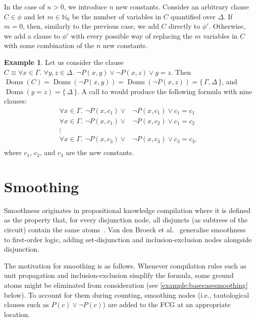 \documentclass{article}
\theoremstyle{definition}
\newtheorem{example}{Example}
\theoremstyle{remark}
\DeclareMathOperator{\Doms}{Doms}
\begin{document}
In the case of $n>0$, we introduce $n$ new constants. Consider an arbitrary
clause $C \in \phi$ and let $m \in \mathbb{N}_{0}$ be the number of variables in
$C$ quantified over $\Delta$. If $m=0$, then, similarly to the previous case, we
add $C$ directly to $\phi'$. Otherwise, we add a clause to $\phi'$ with every
possible way of replacing the $m$ variables in $C$ with some combination of the
$n$ new constants.

\begin{example}
  Let us consider the clause $C \equiv \forall x \in \Gamma\text{.
  }\forall y, z \in \Delta\text{. } \neg P(x, y) \lor \neg P(x, z) \lor y=z$.
  Then
  $\Doms(C) = \Doms(\neg P(x, y)) = \Doms(\neg P(x, z)) = \{\, \Gamma, \Delta \,\}$,
  and $\Doms(y=z) = \{\, \Delta \,\}$. A call to  would produce the following formula with nine clauses:
  \begin{align*}
    \forall x \in \Gamma\text{. }\neg P(x, c_{1}) \lor& \neg P(x, c_{1}) \lor c_{1}=c_{1}\\
    \forall x \in \Gamma\text{. }\neg P(x, c_{1}) \lor& \neg P(x, c_{2}) \lor c_{1}=c_{2}\\
    \vdots&\\
    \forall x \in \Gamma\text{. }\neg P(x, c_{3}) \lor& \neg P(x, c_{3}) \lor c_{3}=c_{3},\\
  \end{align*}
  where $c_{1}$, $c_{2}$, and $c_{3}$ are the new constants.
\end{example}

\section{Smoothing}

Smoothness originates in propositional knowledge compilation where it is defined
as the property that, for every disjunction node, all disjuncts (as subtrees of
the circuit) contain the same atoms~\cite{darwiche2001tractable}. Van den Broeck
et al.~ generalise smoothness to
first-order logic, adding set-disjunction and inclusion-exclusion nodes
alongside disjunction.

The motivation for smoothing is as follows. Whenever compilation rules such as
unit propagation and inclusion-exclusion simplify the formula, some ground atoms
might be eliminated from consideration (see \cref{example:basecasesmoothing}
below). To account for them during counting, smoothing nodes (i.e., tautological
clauses such as $P(c) \lor \neg P(c)$) are added to the FCG at an appropriate
location.
\end{document}
